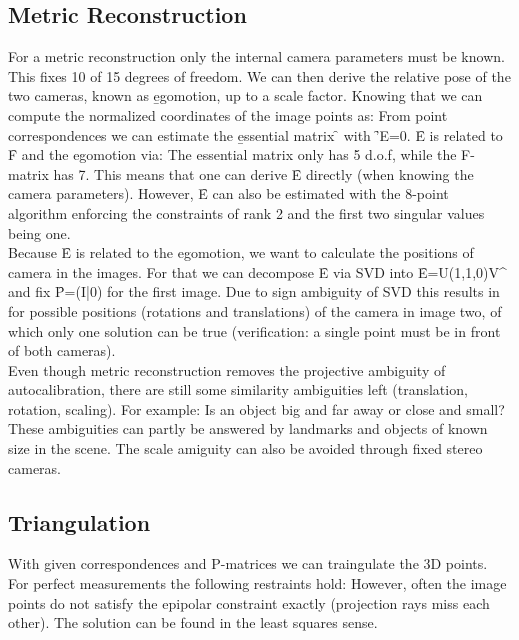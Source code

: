 \subsection{Metric Reconstruction}
For a metric reconstruction only the internal camera parameters must be known. This fixes 10 of 15 degrees of freedom. We can then derive the relative pose of the two cameras, known as \b{egomotion}, up to a scale factor. Knowing that we can compute the normalized coordinates of the image points as:
From point correspondences we can estimate the \b{essential matrix} \f{} with \f{'E=0}. \f{E} is related to \f{F} and the egomotion via:
The essential matrix only has 5 d.o.f, while the F-matrix has 7. This means that one can derive \f{E} directly (when knowing the camera parameters). However, \f{E} can also be estimated with the 8-point algorithm enforcing the constraints of rank 2 and the first two singular values being one.\\
Because \f{E} is related to the egomotion, we want to calculate the positions of camera in the images. For that we can decompose \f{E} via SVD into \f{E=U(1,1,0)V^\top} and fix \f{P=(I|0)} for the first image. Due to sign ambiguity of SVD this results in for possible positions (rotations and translations) of the camera in image two, of which only one solution can be true (verification: a single point must be in front of both cameras).\\

Even though metric reconstruction removes the projective ambiguity of autocalibration, there are still some similarity ambiguities left (translation, rotation, scaling). For example: Is an object big and far away or close and small? These ambiguities can partly be answered by landmarks and objects of known size in the scene. The scale amiguity can also be avoided through fixed stereo cameras.

\subsection{Triangulation}
With given correspondences and P-matrices we can traingulate the 3D points. For perfect measurements the following restraints hold:
However, often the image points do not satisfy the epipolar constraint exactly (projection rays miss each other). The solution can be found in the least squares sense.\\

